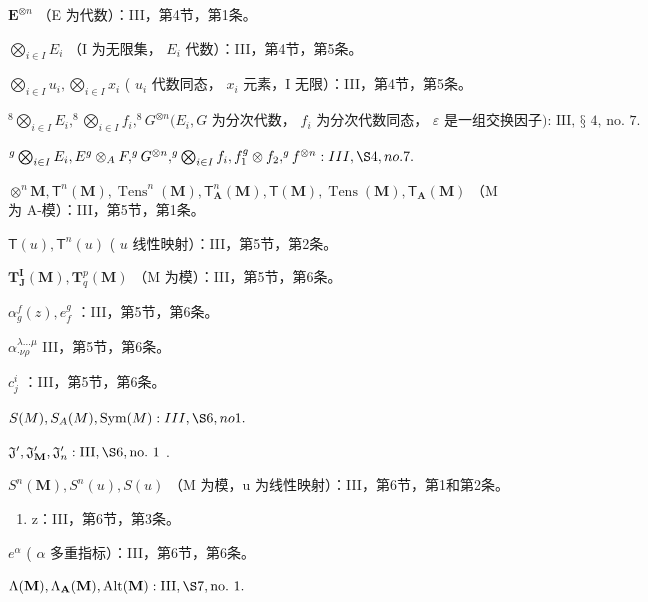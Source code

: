 \(\mathbf{E}^{\otimes n}\) （E 为代数）：III，第4节，第1条。

\(\bigotimes_{i \in I} E_i\) （I 为无限集， \(E_i\) 代数）：III，第4节，第5条。

\(\bigotimes_{i \in I} u_i, \bigotimes_{i \in I} x_i\) ( \(u_i\) 代数同态， \(x_i\) 元素，I 无限）：III，第4节，第5条。

\(^{8}\bigotimes_{i\in I}E_{i},^{8}\bigotimes_{i\in I}f_{i},^{8}G^{\otimes n}(E_{i},G\text{ 为分次代数， }f_{i}\text{ 为分次代数同态， }\varepsilon\text{ 是一组交换因子): III, § 4, no. 7.}\)

\(^{g}\bigotimes_{i\in I}E_{i},E^{g}\otimes_{A}F,^{g}G^{\otimes n},^{g}\bigotimes_{i\in I}f_{i},f_{1}^{g}\otimes f_{2},^{g}f^{\otimes n}:III,\S4,no.7.\)

\(\otimes^{n}\mathbf{M},\mathsf{T}^{n}(\mathbf{M}),\operatorname {Tens}^{n}(\mathbf{M}),\mathsf{T}_{\mathbf{A}}^{n}(\mathbf{M}),\mathsf{T}(\mathbf{M}),\operatorname {Tens}(\mathbf{M}),\mathsf{T}_{\mathbf{A}}(\mathbf{M})\) （M 为 A-模）：III，第5节，第1条。

\(\mathsf{T}(u), \mathsf{T}^n(u)\) ( \(u\) 线性映射）：III，第5节，第2条。

\(\mathbf{T}_{\mathbf{J}}^{\mathbf{I}}(\mathbf{M}), \mathbf{T}_{q}^{p}(\mathbf{M})\) （M 为模）：III，第5节，第6条。

\(\alpha_{g}^{f}(z), e_{f}^{g}\) ：III，第5节，第6条。

\(\alpha_{\cdot \nu \rho}^{\lambda \dots \mu}\) III，第5节，第6条。

\(c_{j}^{i}\) ：III，第5节，第6条。

\(S(M), S_{A}(M), \text{Sym}(M): III, \S 6, no 1.\)

\(\mathfrak{J}^{\prime}, \mathfrak{J}_{\mathbf{M}}^{\prime}, \mathfrak{J}_{n}^{\prime}: \mathrm{III}, \S 6, \mathrm{no.~1}\) .

\(S^{n}(\mathbf{M}), S^{n}(u), S(u)\) （M 为模，u 为线性映射）：III，第6节，第1和第2条。

\begin{enumerate}
\def\labelenumi{\alph{enumi}.}
\setcounter{enumi}{18}
\tightlist
\item
  z：III，第6节，第3条。
\end{enumerate}

\(e^{\alpha}\) ( \(\alpha\) 多重指标）：III，第6节，第6条。

\(\Lambda (\mathbf{M}),\Lambda_{\mathbf{A}}(\mathbf{M}),\mathrm{Alt}(\mathbf{M}):\mathrm{III},\S 7,\mathrm{no.~1.}\)

